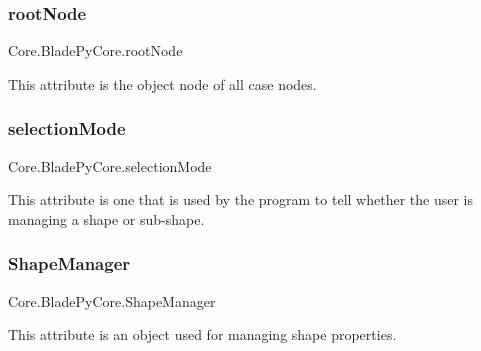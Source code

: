 \hypertarget{class_core_1_1_blade_py_core_a3cbd742c4a4a706d44d5265e19b25aaa}{}\label{class_core_1_1_blade_py_core_a3cbd742c4a4a706d44d5265e19b25aaa} 
\subsubsection{\texorpdfstring{root\+Node}{rootNode}}
{\footnotesize\ttfamily Core.\+Blade\+Py\+Core.\+root\+Node}



This attribute is the object node of all case nodes. 

\hypertarget{class_core_1_1_blade_py_core_a84adec7b4b982bce58747d39e098236f}{}\label{class_core_1_1_blade_py_core_a84adec7b4b982bce58747d39e098236f} 
\subsubsection{\texorpdfstring{selection\+Mode}{selectionMode}}
{\footnotesize\ttfamily Core.\+Blade\+Py\+Core.\+selection\+Mode}



This attribute is one that is used by the program to tell whether the user is managing a shape or sub-\/shape. 

\hypertarget{class_core_1_1_blade_py_core_a1e75ee619926a396b584090b2707b1ca}{}\label{class_core_1_1_blade_py_core_a1e75ee619926a396b584090b2707b1ca} 
\subsubsection{\texorpdfstring{Shape\+Manager}{ShapeManager}}
{\footnotesize\ttfamily Core.\+Blade\+Py\+Core.\+Shape\+Manager}



This attribute is an object used for managing shape properties. 

\hypertarget{class_core_1_1_blade_py_core_a04f16a810669c721b389767d47c08c8f}{}\label{class_core_1_1_blade_py_core_a04f16a810669c721b389767d47c08c8f} 
